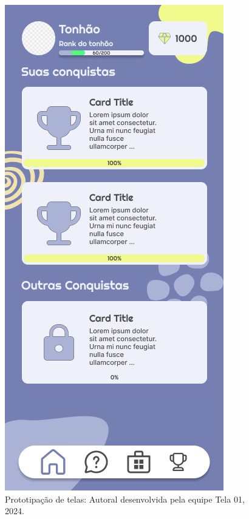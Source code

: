 \documentclass[12pt, openany, oneside, a4paper, english, brazil]{abntex2}   %
\begin{document}
\begin{figure}
    \centering
    \includegraphics[scale=0.7]{figuras/Math.Pow App/Achievements Alternative BG.png}
    \caption{Prototipação de telas: Autoral desenvolvida pela equipe Tela 01, 2024.}
    \label{fig:nome-da-imagem}
\end{figure}
\end{document}
